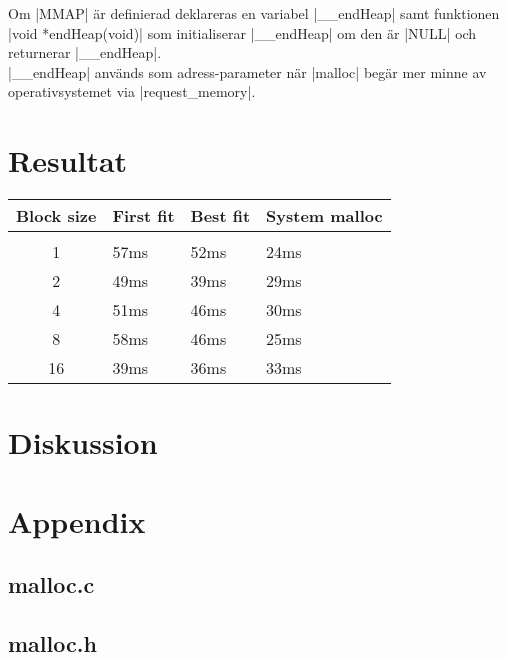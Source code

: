 \documentclass[paper=a4, fontsize=11pt]{scrartcl} %
\numberwithin{equation}{section} %
\numberwithin{figure}{section} %
\numberwithin{table}{section} %
\begin{document}
%
%
Om |MMAP| är definierad deklareras en variabel |__endHeap| samt funktionen 
|void *endHeap(void)| som initialiserar |__endHeap| om den är |NULL| och returnerar |__endHeap|.\\

|__endHeap| används som adress-parameter när |malloc| begär mer minne av operativsystemet via |request_memory|.




\section{Resultat}


\begin{table}[h!] %
\begin{tabular}{ c l l l}
   Block size & First fit & Best fit & System malloc \\
  \hline \\
  1 & 57ms & 52ms & 24ms \\
  2 & 49ms & 39ms & 29ms \\
  4 & 51ms & 46ms & 30ms \\
  8 & 58ms & 46ms & 25ms \\
  16 & 39ms & 36ms & 33ms \\
\end{tabular}
\end{table}


\section{Diskussion}


\newpage
\section*{Appendix}
\subsection*{malloc.c}


\newpage
\subsection*{malloc.h}

\end{document}
